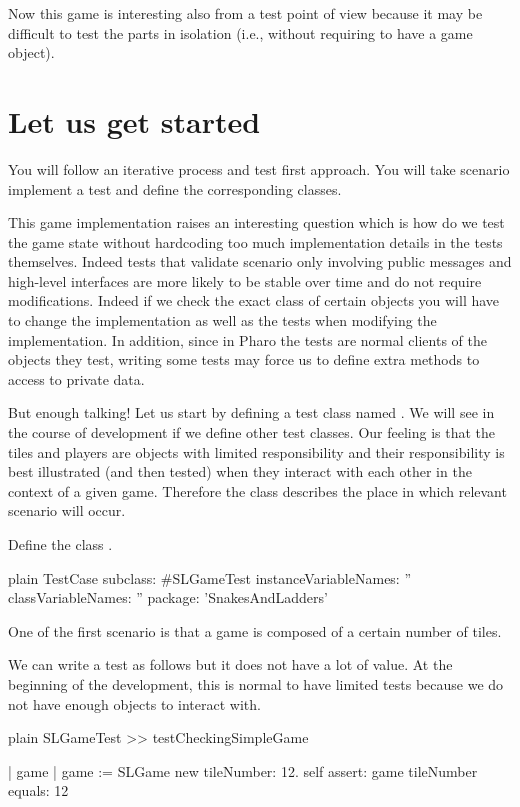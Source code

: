\documentclass[10pt,twoside,english]{_support/latex/sbabook/sbabook}
\begin{document}
Now this game is interesting also from a test point of view because it may be difficult to test the parts in isolation (i.e., without requiring to have a game object).
\section{Let us get started}
You will follow an iterative process and test first approach. You will take scenario implement a test and define the corresponding classes. 

This game implementation raises an interesting question which is how do we test the game state
without hardcoding too much implementation details in the tests themselves. Indeed tests that validate scenario only involving public messages and high-level interfaces are more likely to be stable over time and do not require modifications. Indeed if we check the exact class of certain objects you will have to change the implementation as well as the tests when modifying the implementation. In addition, since in Pharo the tests are normal clients of the objects they test, writing some tests may force us to define extra methods to access to private data. 

But enough talking! 
Let us start by defining a test class named . We will see in the course of development if we define other test classes. Our feeling is that the tiles and players are objects with limited responsibility and their responsibility is best illustrated (and then tested) when they interact with each other in the context of a given game. Therefore
the class  describes the place in which relevant scenario will occur. 

Define the class .

\begin{displaycode}{plain}
TestCase subclass: #SLGameTest
	instanceVariableNames: ''
	classVariableNames: ''
	package: 'SnakesAndLadders'
\end{displaycode}

One of the first scenario is that a game is composed of a certain number of tiles. 

We can write a test as follows but it does not have a lot of value. At the beginning of the development, this is normal to have limited tests because we do not have enough objects to interact with. 

\begin{displaycode}{plain}
SLGameTest >> testCheckingSimpleGame

	| game |
	game := SLGame new tileNumber: 12.
	self assert: game tileNumber equals: 12
\end{displaycode}
\end{document}
